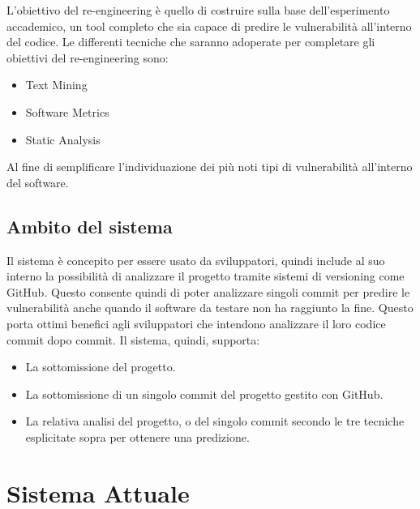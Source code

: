 \documentclass{article}
\begin{document}
L'obiettivo del re-engineering è quello di costruire sulla base dell'esperimento accademico, un tool completo che sia capace di predire le vulnerabilità all'interno del codice. Le differenti tecniche che saranno adoperate per completare gli obiettivi del re-engineering sono:
\begin{itemize}
    \item Text Mining 
    \item Software Metrics
    \item Static Analysis
\end{itemize}
Al fine di semplificare l'individuazione dei più noti tipi di vulnerabilità all'interno del software.

\subsection{Ambito del sistema}
Il sistema è concepito per essere usato da sviluppatori, quindi include al suo interno la possibilità di analizzare il progetto tramite sistemi di versioning come GitHub. Questo consente quindi di poter analizzare singoli commit per predire le vulnerabilità anche quando il software da testare non ha raggiunto la fine. 
Questo porta ottimi benefici agli sviluppatori che intendono analizzare il loro codice commit dopo commit. 
Il sistema, quindi, supporta:
\begin{itemize}
    \item La sottomissione del progetto.
    \item La sottomissione di un singolo commit del progetto gestito con GitHub.
    \item La relativa analisi del progetto, o del singolo commit secondo le tre tecniche esplicitate sopra per ottenere una predizione.
\end{itemize}

 

\section{Sistema Attuale}
\end{document}
